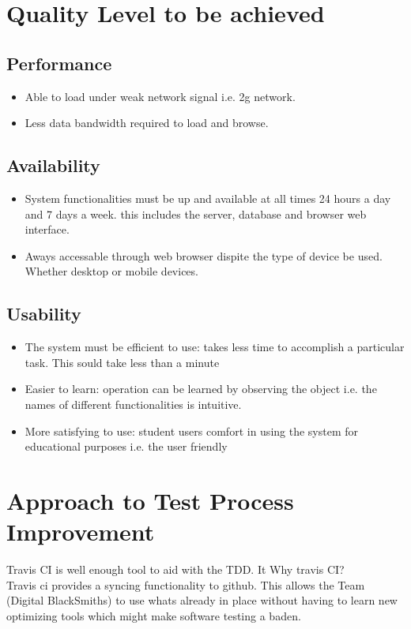\documentclass[a4paper,12pt]{article}
\begin{document}
	\section{Quality Level to be achieved}
	\subsection{Performance}
	\begin{itemize}
		\item Able to load under weak network signal i.e. 2g network.
		\item Less data bandwidth required to load and browse.
	\end{itemize}
	\subsection{Availability}
	\begin{itemize}
		\item System functionalities must be up and available at all times 24 hours a day and 7 days a week. this includes the server, database and browser web interface.
		\item Aways accessable through web browser dispite the type of device be used. Whether desktop or mobile devices.
	\end{itemize}
	\subsection{Usability}
	\begin{itemize}
		\item The system must be efficient to use: takes less time to accomplish a particular task. This sould take less than a minute
		\item Easier to learn: operation can be learned by observing the object i.e. the names of different functionalities is intuitive.
		\item More satisfying to use: student users comfort in using the system for educational purposes i.e. the user friendly
	\end{itemize}
	
	\section{Approach to Test Process Improvement}
	
	Travis CI is well enough tool to aid with the TDD. It 
	Why travis CI? \\
	Travis ci provides a syncing functionality to github. 
	This allows the Team (Digital BlackSmiths) to use whats already in place without having to learn new optimizing tools which might make software testing a baden. 
\end{document}
